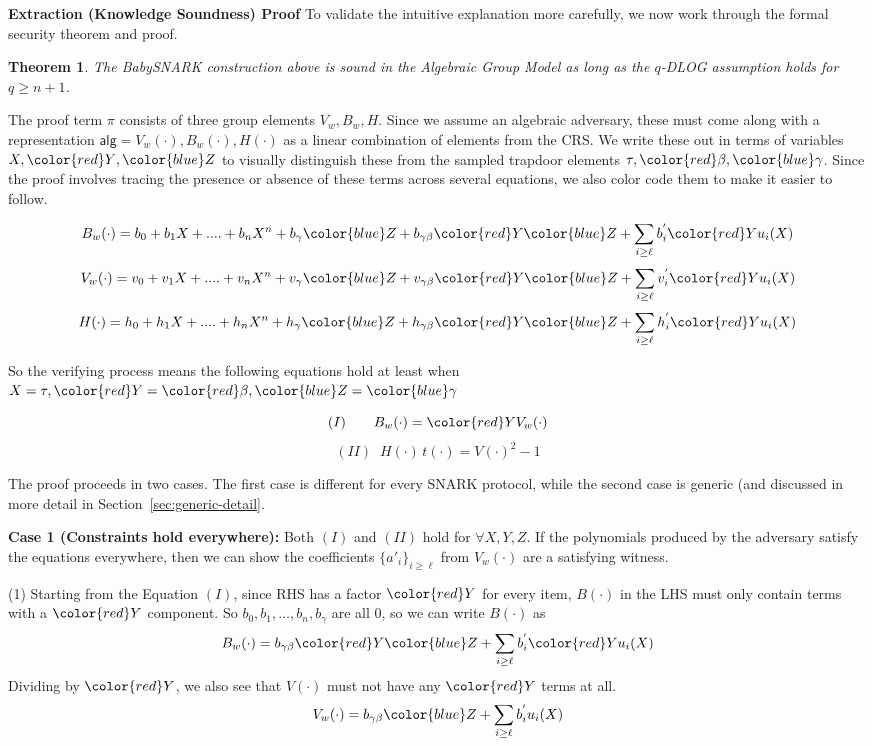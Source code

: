 \documentclass{article}
\newtheorem{theorem}{Theorem}
\theoremstyle{definition}
\theoremstyle{remark}
\begin{document}
\textbf{Extraction (Knowledge Soundness) Proof}
To validate the intuitive explanation more carefully, we now work through the formal security theorem and proof.
\begin{theorem}
The \textsf{BabySNARK} construction above is sound in the Algebraic Group Model as long as the $q$-DLOG assumption holds for $q \ge n+1$.
\end{theorem}
\proof
The proof term $\pi$ consists of three group elements $V_w, B_w, H$. Since we assume an algebraic adversary, these must come along with a representation $\textsf{alg} = V_w(\cdot), B_w(\cdot), H(\cdot)$ as a linear combination of elements from the CRS. We write these out in terms of variables $X, {\color{red}Y}, {\color{blue}Z}$ to visually distinguish these from the sampled trapdoor elements $\tau, {\color{red}\beta}, {\color{blue}\gamma}$. 
Since the proof involves tracing the presence or absence of these terms across several equations, we also color code them to make it easier to follow.
{
$$B_w(\cdot) = b_0 + b_1X+....+b_nX^n + b_{\gamma}{\color{blue}Z} + b_{\gamma \beta}{\color{red}Y}{\color{blue}Z} + \sum_{i \ge \ell}{b^{'}_i {\color{red}Y}u_i(X)}$$
$$V_w(\cdot) = v_0 + v_1X+....+v_nX^n + v_{\gamma}{\color{blue}Z} + v_{\gamma \beta}{\color{red}Y}{\color{blue}Z} + \sum_{i \ge \ell}v^{'}_i {\color{red}Y}u_i(X)$$
$$H(\cdot) = h_0 + h_1X+....+h_nX^n + h_{\gamma}{\color{blue}Z} + h_{\gamma \beta}{\color{red}Y}{\color{blue}Z} + \sum_{i \ge \ell}h^{'}_i {\color{red}Y}u_i(X)$$

So the verifying process means the following equations hold at least when $X=\tau, {\color{red}Y}={\color{red}\beta}, {\color{blue}Z}={\color{blue}\gamma}$
}
$$
(I)~~~~~\,\, B_w(\cdot) = {\color{red}Y} V_w(\cdot)
$$
$$(II)~\,\, H(\cdot) \, t(\cdot) = V(\cdot)^2-1$$

The proof proceeds in two cases. The first case is different for every SNARK protocol, while the second case is generic (and discussed in more detail in Section~\ref{sec:generic-detail}.

\textbf{Case 1 (Constraints hold everywhere):} Both $(I)$ and $(II)$ hold for $\forall X,Y,Z$.
If the polynomials produced by the adversary satisfy the equations everywhere, then we can show the coefficients $\{a'_i\}_{i\ge \ell}$ from $V_w(\cdot)$ are a satisfying witness.

(1) Starting from the Equation $(I)$, since RHS has a factor ${\color{red}Y}$ for every item, $B(\cdot)$ in the LHS must only contain terms with a ${\color{red}Y}$ component. So $b_0,b_1,\ldots,b_n,b_\gamma$ are all 0, so we can write $B(\cdot)$ as 
$$B_w(\cdot) = b_{\gamma \beta}{\color{red}Y}{\color{blue}Z} + \sum_{i \ge \ell}b^{'}_i {\color{red}Y}u_i(X)$$
Dividing by ${\color{red}Y}$, we also see that $V(\cdot)$ must not have any ${\color{red}Y}$ terms at all.
$$V_w(\cdot) = b_{\gamma \beta}{\color{blue}Z} + \sum_{i \ge \ell}b^{'}_i u_i(X)$$
\end{document}
